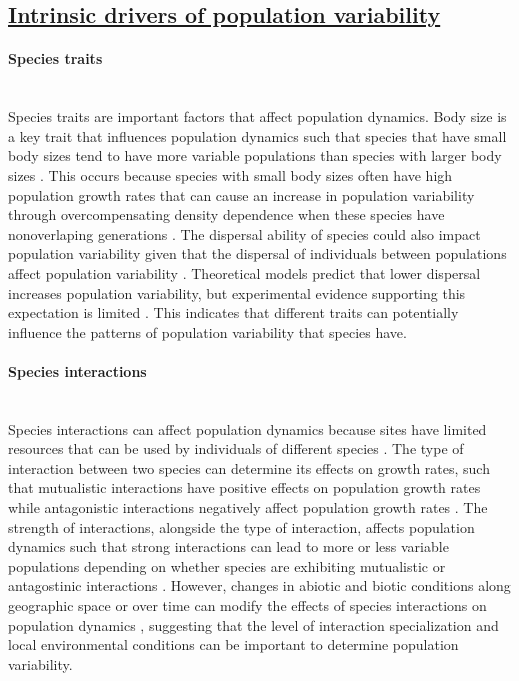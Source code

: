  
 
\subsection*{\textbf{\underline{Intrinsic drivers of population variability}}}
\paragraph*{Species traits}\mbox{}\\ 
Species traits are important factors that affect population dynamics. Body size is a key trait that influences population dynamics such that species that have small body sizes tend to have more variable populations than species with larger body sizes \parencite{lawton1986, gaston1988}. This occurs because species with small body sizes often have high population growth rates that can cause an increase in population variability through overcompensating density dependence when these species have nonoverlaping generations \parencite{may1974, gaston1988}. The dispersal ability of species could also impact population variability given that the dispersal of individuals between populations affect population variability \parencite{abbott2011}. Theoretical models predict that lower dispersal increases population variability, but experimental evidence supporting this expectation is limited \parencite{abbott2011, yang2022}. This indicates that different traits can potentially influence the patterns of population variability that species have. 


\paragraph*{Species interactions}\mbox{}\\ 
Species interactions can affect population dynamics because sites have limited resources that can be used by individuals of different species \parencite{macarthur1970, rhoades1985}. The type of interaction between two species can determine its effects on growth rates, such that mutualistic interactions have positive effects on population growth rates while antagonistic interactions negatively affect population growth rates \parencite{ehrlen1995, hale2021}. The strength of interactions, alongside the type of interaction, affects population dynamics such that strong interactions can lead to more or less variable populations depending on whether species are exhibiting mutualistic or antagostinic interactions \parencite{allesina2012,mougi2014}. However, changes in abiotic and biotic conditions along geographic space or over time can modify the effects of species interactions on population dynamics \parencite{travis1996, chamberlain2014}, suggesting that the level of interaction specialization \parencite{arino1995} and local environmental conditions can be important to determine population variability. 


